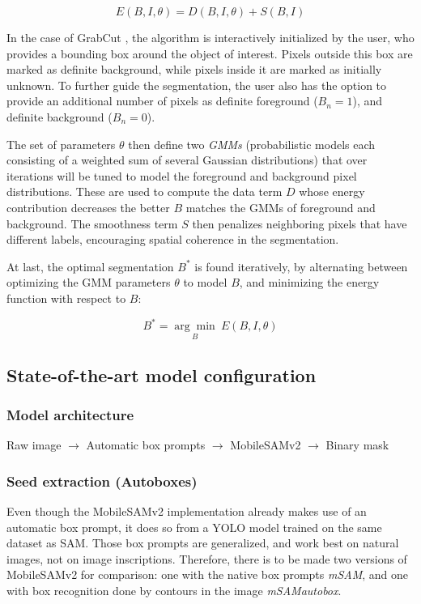 $$ E(B,I,\theta) = D(B,I,\theta) + S(B,I) $$

\noindent In the case of GrabCut \parencite{Rother2004GrabCut}, the algorithm is interactively initialized by the user, who provides a bounding box around the object of interest.
Pixels outside this box are marked as definite background, while pixels inside it are marked as initially unknown.
To further guide the segmentation, the user also has the option to provide an additional number of pixels as definite foreground ($B_n = 1$), and definite background ($B_n = 0$).

The set of parameters $\theta$ then define two \textit{\acp{GMM}} (probabilistic models each consisting of a weighted sum of several Gaussian distributions) that over iterations will be tuned to model the foreground and background pixel distributions.
These are used to compute the data term $D$ whose energy contribution decreases the better $B$ matches the \acsp{GMM} of foreground and background.
The smoothness term $S$ then penalizes neighboring pixels that have different labels, encouraging spatial coherence in the segmentation.

At last, the optimal segmentation $B^{*}$ is found iteratively, by alternating between optimizing the \acs{GMM} parameters $\theta$ to model $B$, and minimizing the energy function with respect to $B$:

$$ B^{*} = \underset{B}{\arg \min} ~ E(B,I,\theta) $$

\subsection{State-of-the-art model configuration}
\subsubsection{Model architecture}
Raw image $\rightarrow$ Automatic box prompts $\rightarrow$ MobileSAMv2 $\rightarrow$ Binary mask

\subsubsection{Seed extraction (Autoboxes)}
Even though the MobileSAMv2 implementation already makes use of an automatic box prompt, it does so from a YOLO model trained on the same dataset as SAM.
Those box prompts are generalized, and work best on natural images, not on image inscriptions.
Therefore, there is to be made two versions of MobileSAMv2 for comparison: one with the native box prompts \textit{mSAM}, and one with box recognition done by contours in the image \textit{mSAMautobox}.

